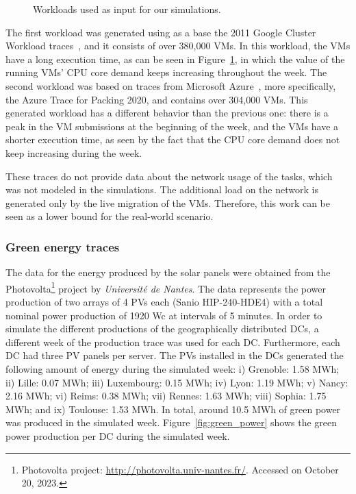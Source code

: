 \begin{figure}[h]
  \centering
   {}
  \caption{Workloads used as input for our simulations.}
  \label{fig:workload}
 \end{figure}

The first workload was generated using as a base the 2011 Google Cluster Workload traces~\cite{google2011traces}, and it consists of over 380,000 VMs. In this workload, the VMs have a long execution time, as can be seen in Figure~\ref{fig:workload}, in which the value of the running VMs' CPU core demand keeps increasing throughout the week. The second workload was based on traces from Microsoft Azure~\cite{hadary2020protean}, more specifically, the Azure Trace for Packing 2020, and contains over 304,000 VMs. This generated workload has a different behavior than the previous one: there is a peak in the VM submissions at the beginning of the week, and the VMs have a shorter execution time, as seen by the fact that the CPU core demand does not keep increasing during the week.

These traces do not provide data about the network usage of the tasks, which was not modeled in the simulations. The additional load on the network is generated only by the live migration of the VMs. Therefore, this work can be seen as a lower bound for the real-world scenario.


\subsubsection{Green energy traces}

The data for the energy produced by the solar panels were obtained from the Photovolta\footnote{Photovolta project: \url{http://photovolta.univ-nantes.fr/}. Accessed on October 20, 2023.} project by \textit{Université de Nantes}. The data represents the power production of two arrays of 4 PVs each (Sanio HIP-240-HDE4) with a total nominal power production of 1920 Wc at intervals of 5 minutes. In order to simulate the different productions of the geographically distributed DCs,  a different week of the production trace was used for each DC. Furthermore, each DC had three PV panels per server. The PVs installed in the DCs generated the following amount of energy during the simulated week: i) Grenoble: 1.58 MWh; ii) Lille: 0.07 MWh; iii) Luxembourg: 0.15 MWh; iv) Lyon: 1.19 MWh; v) Nancy: 2.16 MWh; vi) Reims: 0.38 MWh; vii) Rennes: 1.63 MWh; viii) Sophia: 1.75 MWh; and ix) Toulouse: 1.53 MWh. In total, around 10.5 MWh of green power was produced in the simulated week. Figure~\ref{fig:green_power} shows the green power production per DC during the simulated week.

